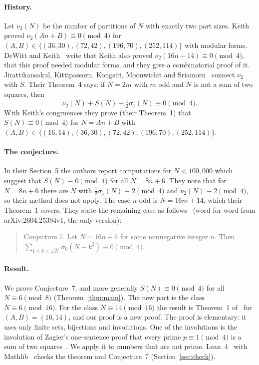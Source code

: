 \documentclass[11pt]{article}
\theoremstyle{remark}
\begin{document}
\paragraph{History.} Let $\nu_2(N)$ be the number of partitions of $N$ with exactly two part sizes. Keith~\cite{Keith} proved $\nu_2(An+B)\equiv 0\pmod 4$ for $(A,B)\in\{(36,30),(72,42),(196,70),(252,114)\}$ with modular forms. DeWitt and Keith~\cite{DK,DKjour} write that Keith also proved $\nu_2(16n+14)\equiv 0\pmod 4$, that this proof needed modular forms, and they give a combinatorial proof of it. Jirattikansakul, Kittipassorn, Kongsiri, Moonwichit and Sriamorn~\cite{JKKMS} connect $\nu_2$ with $S$. Their Theorem~4 says: if $N=2m$ with $m$ odd and $N$ is not a sum of two squares, then
\begin{equation}\label{eq:thm4}
\nu_2(N)+S(N)+\tfrac12\sigma_1(N)\equiv 0\pmod 4.
\end{equation}
With Keith's congruences they prove (their Theorem~1) that $S(N)\equiv 0\pmod 4$ for $N=An+B$ with $(A,B)\in\{(16,14),(36,30),(72,42),(196,70),(252,114)\}$.

\paragraph{The conjecture.} In their Section~5 the authors report computations for $N<100{,}000$ which suggest that $S(N)\equiv 0\pmod 4$ for all $N=8n+6$. They note that for $N=8n+6$ there are $N$ with $\frac12\sigma_1(N)\equiv 2\pmod 4$ and $\nu_2(N)\equiv 2\pmod 4$, so their method does not apply. The case $n$ odd is $N=16m+14$, which their Theorem~1 covers. They state the remaining case as follows~\cite[Conjecture~7]{JKKMS} (word for word from arXiv:2604.25394v1, the only version):
\begin{quote}
Conjecture 7. Let $N=16n+6$ for some nonnegative integer $n$. Then $\sum_{1\le k<\sqrt N}\sigma_0(N-k^2)\equiv 0\pmod 4$.
\end{quote}

\paragraph{Result.} We prove Conjecture~7, and more generally $S(N)\equiv 0\pmod 4$ for all $N\equiv 6\pmod 8$ (Theorem~\ref{thm:main}). The new part is the class $N\equiv 6\pmod{16}$. For the class $N\equiv 14\pmod{16}$ the result is Theorem~1 of~\cite{JKKMS} for $(A,B)=(16,14)$, and our proof is a new proof. The proof is elementary: it uses only finite sets, bijections and involutions. One of the involutions is the involution of Zagier's one-sentence proof that every prime $p\equiv 1\pmod 4$ is a sum of two squares~\cite{Zagier}. We apply it to numbers that are not prime. Lean~4~\cite{Lean} with Mathlib~\cite{Mathlib} checks the theorem and Conjecture~7 (Section~\ref{sec:check}).
\end{document}

